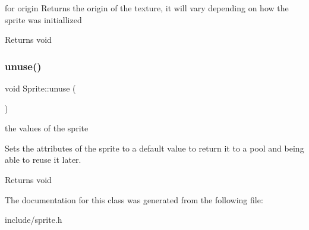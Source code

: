 for origin Returns the origin of the texture, it will vary depending on how the sprite was initiallized

\begin{DoxyReturn}{Returns}
void 
\end{DoxyReturn}
\mbox{\label{class_sprite_a26019c4dc52face7a098ddace9926863}} 
\subsubsection{\texorpdfstring{unuse()}{unuse()}}
{\footnotesize\ttfamily void Sprite\+::unuse (\begin{DoxyParamCaption}{ }\end{DoxyParamCaption})}

the values of the sprite

Sets the attributes of the sprite to a default value to return it to a pool and being able to reuse it later.

\begin{DoxyReturn}{Returns}
void 
\end{DoxyReturn}


The documentation for this class was generated from the following file\+:\begin{DoxyCompactItemize}
\item 
include/sprite.\+h\end{DoxyCompactItemize}
